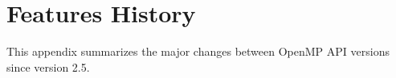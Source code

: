 %
%
%
%
%
%
%
%
%
%
%
%


\chapter{Features History}
\label{chap:Features History}
This appendix summarizes the major changes between OpenMP API 
versions since version 2.5.



